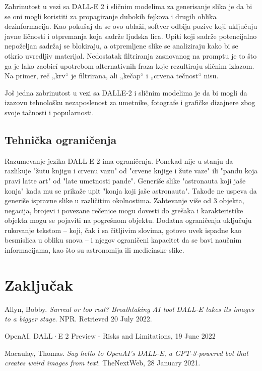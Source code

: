 \documentclass[a4paper]{article}
\begin{document}
Zabrinutost u vezi sa DALL-E 2 i sličnim modelima za generisanje slika je da bi se oni mogli koristiti za propagiranje dubokih fejkova i drugih oblika dezinformacija. Kao pokušaj da se ovo ublaži, softver odbija pozive koji uključuju javne ličnosti i otpremanja koja sadrže ljudska lica. Upiti koji sadrže potencijalno nepoželjan sadržaj se blokiraju, a otpremljene slike se analiziraju kako bi se otkrio uvredljiv materijal. Nedostatak filtriranja zasnovanog na promptu je to što ga je lako zaobicí upotrebom alternativnih fraza  koje rezultiraju sličnim izlazom. Na primer, reč „krv“ je filtrirana, ali „kečap“ i „crvena tečnost“ nisu.

Još jedna zabrinutost u vezi sa DALLE-2 i sličnim modelima je da bi mogli da izazovu tehnološku  nezaposlenost za umetnike, fotografe i grafičke dizajnere zbog svoje tačnosti i popularnosti.
\subsection{Tehnička ograničenja}
\label{subsec: Tehnička ograničenja}
Razumevanje jezika DALL-E 2 ima ograničenja. Ponekad nije u stanju da razlikuje "žutu knjigu i crvenu vazu" od "crvene knjige i žute vaze" ili "pandu koja pravi latte art" od "late umetnosti pande". Generiše slike "astronauta koji jaše konja" kada mu se prikaže upit "konja koji jaše astronauta". Takođe ne uspeva da generiše ispravne slike u različitim okolnostima. Zahtevanje više od 3 objekta, negacija, brojevi i povezane rečenice mogu dovesti do grešaka i karakteristike objekta mogu se pojaviti na pogrešnom objektu. Dodatna ograničenja uključuju rukovanje tekstom – koji, čak i sa čitljivim slovima, gotovo uvek ispadne kao besmislica u obliku snova – i njegov ograničeni kapacitet da se bavi naučnim informacijama, kao što su astronomija ili medicinske slike.
\newpage
\section{Zaključak}

\appendix

\begin{thebibliography}{9}

\bibitem{} Allyn, Bobby. \emph{ Surreal or too real? Breathtaking AI tool DALL-E takes its images to a bigger stage}. NPR. Retrieved 20 July 2022.

\bibitem{}  OpenAI.  DALL·E 2 Preview - Risks and Limitations, 19 June 2022 

\bibitem{}  Macaulay, Thomas. \emph{ Say hello to OpenAI's DALL-E, a GPT-3-powered bot that creates weird images from text}. TheNextWeb, 28 January 2021.


\end{thebibliography}


\appendix
\end{document}
